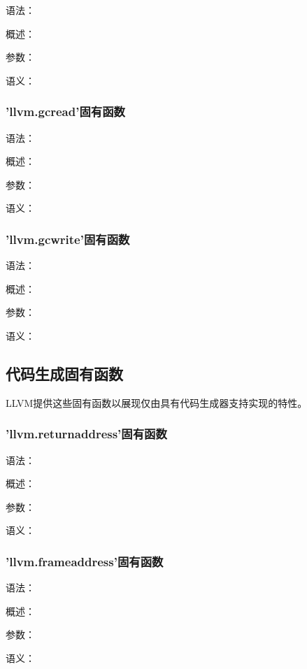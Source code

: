 \documentclass[12pt,a4paper]{article}
\begin{document}
{语法：

概述：

参数：

语义：


\subsubsection{'llvm.gcread'固有函数} %

语法：

概述：

参数：

语义：


\subsubsection{'llvm.gcwrite'固有函数} %

语法：

概述：

参数：

语义：


\subsection{代码生成固有函数}

LLVM提供这些固有函数以展现仅由具有代码生成器支持实现的特性。

\subsubsection{'llvm.returnaddress'固有函数} %

语法：

概述：

参数：

语义：


\subsubsection{'llvm.frameaddress'固有函数} %

语法：

概述：

参数：

语义：

}
\end{document}

